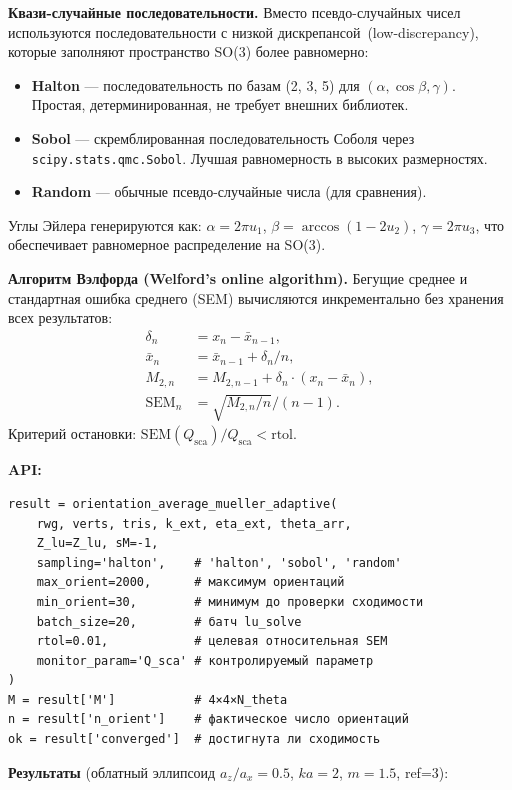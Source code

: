 \documentclass[12pt,a4paper]{article}
\begin{document}
\textbf{Квази-случайные последовательности.}
Вместо псевдо-случайных чисел используются последовательности с низкой дискрепансой~(low-discrepancy),
которые заполняют пространство SO(3) более равномерно:
\begin{itemize}
  \item \textbf{Halton} --- последовательность по базам (2, 3, 5) для $(\alpha, \cos\beta, \gamma)$.
        Простая, детерминированная, не требует внешних библиотек.
  \item \textbf{Sobol} --- скремблированная последовательность Соболя через \texttt{scipy.stats.qmc.Sobol}.
        Лучшая равномерность в высоких размерностях.
  \item \textbf{Random} --- обычные псевдо-случайные числа (для сравнения).
\end{itemize}
Углы Эйлера генерируются как: $\alpha = 2\pi u_1$, $\beta = \arccos(1 - 2u_2)$, $\gamma = 2\pi u_3$,
что обеспечивает равномерное распределение на SO(3).

\textbf{Алгоритм Вэлфорда (Welford's online algorithm).}
Бегущие среднее и стандартная ошибка среднего (SEM) вычисляются инкрементально
без хранения всех результатов:
\begin{align}
  \delta_n &= x_n - \bar{x}_{n-1}, \\
  \bar{x}_n &= \bar{x}_{n-1} + \delta_n / n, \\
  M_{2,n} &= M_{2,n-1} + \delta_n \cdot (x_n - \bar{x}_n), \\
  \mathrm{SEM}_n &= \sqrt{M_{2,n} / n} / (n-1).
\end{align}
Критерий остановки: $\mathrm{SEM}(Q_\mathrm{sca}) / Q_\mathrm{sca} < \mathrm{rtol}$.

\textbf{API:}
\begin{verbatim}
result = orientation_average_mueller_adaptive(
    rwg, verts, tris, k_ext, eta_ext, theta_arr,
    Z_lu=Z_lu, sM=-1,
    sampling='halton',    # 'halton', 'sobol', 'random'
    max_orient=2000,      # максимум ориентаций
    min_orient=30,        # минимум до проверки сходимости
    batch_size=20,        # батч lu_solve
    rtol=0.01,            # целевая относительная SEM
    monitor_param='Q_sca' # контролируемый параметр
)
M = result['M']           # 4×4×N_theta
n = result['n_orient']    # фактическое число ориентаций
ok = result['converged']  # достигнута ли сходимость
\end{verbatim}

\textbf{Результаты} (облатный эллипсоид $a_z/a_x = 0.5$, $ka = 2$, $m = 1.5$, ref=3):
\end{document}
